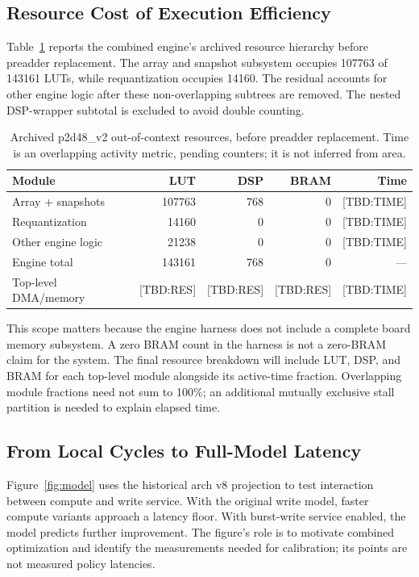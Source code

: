\documentclass[10pt,conference,letterpaper]{IEEEtran}
\newcommand{\pending}[1]{\textcolor{red!65!black}{\textsf{[TBD:#1]}}}
\begin{document}
\subsection{Resource Cost of Execution Efficiency}
Table~\ref{tab:resources} reports the combined engine's archived resource hierarchy before preadder replacement. The array and snapshot subsystem occupies 107763 of 143161 LUTs, while requantization occupies 14160. The residual accounts for other engine logic after these non-overlapping subtrees are removed. The nested DSP-wrapper subtotal is excluded to avoid double counting.

\begin{table}[t]\centering\caption{Archived p2d48\_v2 out-of-context resources, before preadder replacement. Time is an overlapping activity metric, pending counters; it is not inferred from area.}\label{tab:resources}
\scriptsize\setlength{\tabcolsep}{2pt}\begin{tabular}{lrrrr}\toprule
Module & LUT & DSP & BRAM & Time \\\midrule
Array + snapshots & 107763 & 768 & 0 & \pending{TIME} \\
Requantization & 14160 & 0 & 0 & \pending{TIME} \\
Other engine logic & 21238 & 0 & 0 & \pending{TIME} \\
Engine total & 143161 & 768 & 0 & --- \\
Top-level DMA/memory & \pending{RES} & \pending{RES} & \pending{RES} & \pending{TIME} \\\bottomrule
\end{tabular}\end{table}

This scope matters because the engine harness does not include a complete board memory subsystem. A zero BRAM count in the harness is not a zero-BRAM claim for the system. The final resource breakdown will include LUT, DSP, and BRAM for each top-level module alongside its active-time fraction. Overlapping module fractions need not sum to 100\%; an additional mutually exclusive stall partition is needed to explain elapsed time.

\subsection{From Local Cycles to Full-Model Latency}
Figure~\ref{fig:model} uses the historical arch v8 projection to test interaction between compute and write service. With the original write model, faster compute variants approach a latency floor. With burst-write service enabled, the model predicts further improvement. The figure's role is to motivate combined optimization and identify the measurements needed for calibration; its points are not measured policy latencies.
\end{document}
